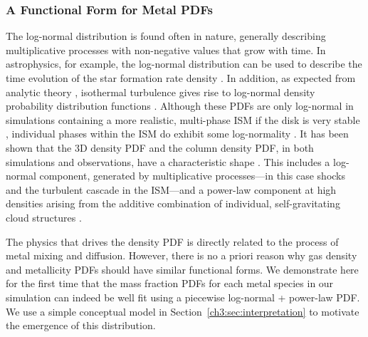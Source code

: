 \subsubsection{A Functional Form for Metal PDFs}
\label{ch3:sec:log-normal}

The log-normal distribution is found often in nature, generally describing multiplicative processes with non-negative values that grow with time. In astrophysics, for example, the log-normal distribution can be used to describe the time evolution of the star formation rate density \citep[see ][]{Gladders2013,Abramson2016,Diemer2017}. In addition, as expected from analytic theory \citep{Vazquez-Semadeni1994}, isothermal turbulence gives rise to log-normal density probability distribution functions \citep[PDFs;][]{Padoan1997, Passot1998, Ostriker1999,PadoanNordlund2002,KrumholzMcKee2005,Federrath2008}. Although these PDFs are only log-normal in simulations containing a more realistic, multi-phase ISM \citep{Scalo1998} if the disk is very stable \citep{WadaNorman2007}, individual phases within the ISM do exhibit some log-normality \citep{Tasker2009, Tasker2011,Joung2009,PriceFederrathBrunt2011, HQM2012}. It has been shown that the 3D density PDF and the column density PDF, in both simulations and observations, have a characteristic shape \citep{Vazquez-Semadeni1994,Burkhart2009, FederrathKlessen2013, Collins2012, Myers2015, Burkhart2017, Chen2018}. This includes a log-normal component, generated by multiplicative processes---in this case shocks and the turbulent cascade in the ISM---and a power-law component at high densities arising from the additive combination of individual, self-gravitating cloud structures .

The physics that drives the density PDF is directly related to the process of metal mixing and diffusion. However, there is no a priori reason why gas density and metallicity PDFs should have similar functional forms. We demonstrate here for the first time that the mass fraction PDFs for each metal species in our simulation can indeed be well fit using a piecewise log-normal + power-law PDF. We use a simple conceptual model in Section~\ref{ch3:sec:interpretation} to motivate the emergence of this distribution.


